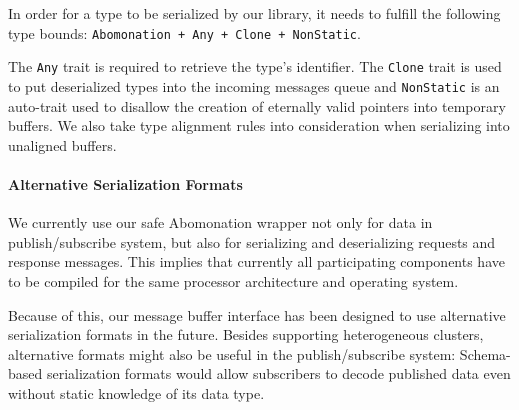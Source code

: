 In order for a type to be serialized by our library, it needs to fulfill the
following type bounds: \lstinline{Abomonation + Any + Clone + NonStatic}.

The \lstinline{Any} trait is required to retrieve the type's identifier. The
\lstinline{Clone} trait is used to put deserialized types into the incoming
messages queue and \lstinline{NonStatic} is an auto-trait used to disallow the
creation of eternally valid pointers into temporary buffers. We also take type
alignment rules into consideration when serializing into unaligned buffers. 

\paragraph{Alternative Serialization Formats}

We currently use our safe Abomonation wrapper not only for data in
publish/subscribe system, but also for serializing and deserializing requests
and response messages. This implies that currently all participating components
have to be compiled for the same processor architecture and operating system.

Because of this, our message buffer interface has been designed to use alternative
serialization formats in the future. Besides supporting heterogeneous clusters,
alternative formats might also be useful in the publish/subscribe system:
Schema-based serialization formats would allow subscribers to decode published
data even without static knowledge of its data type.
